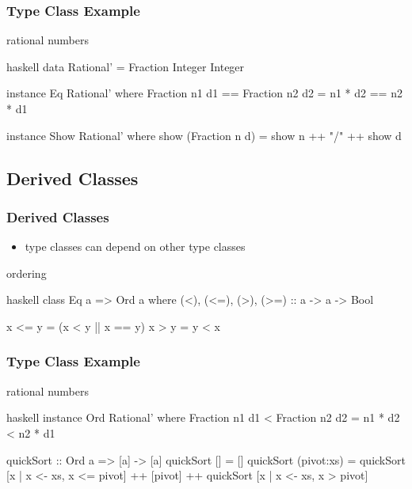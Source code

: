 \documentclass[dvipsnames]{beamer}
\theoremstyle{plain}
\begin{document}
\begin{frame}[fragile]
  \frametitle{Type Class Example}

  \begin{exampleblock}{rational numbers}
    \begin{pygments}{haskell}
data Rational' = Fraction Integer Integer

instance Eq Rational' where
  Fraction n1 d1 == Fraction n2 d2 =
      n1 * d2 == n2 * d1

instance Show Rational' where
  show (Fraction n d) = show n ++ "/" ++ show d
    \end{pygments}
  \end{exampleblock}
\end{frame}

\subsection{Derived Classes}

\begin{frame}[fragile]
  \frametitle{Derived Classes}

  \begin{itemize}
    \item type classes can depend on other type classes
  \end{itemize}

  \begin{exampleblock}{ordering}
    \begin{pygments}{haskell}
class Eq a => Ord a where
  (<), (<=), (>), (>=) :: a -> a -> Bool

  x <= y = (x < y || x == y)
  x >  y = y < x
    \end{pygments}
  \end{exampleblock}
\end{frame}

\begin{frame}[fragile]
  \frametitle{Type Class Example}

  \begin{exampleblock}{rational numbers}
    \begin{pygments}{haskell}
instance Ord Rational' where
  Fraction n1 d1 < Fraction n2 d2 = n1 * d2 < n2 * d1

quickSort :: Ord a => [a] -> [a]
quickSort []         = []
quickSort (pivot:xs) =
    quickSort [x | x <- xs, x <= pivot]
    ++ [pivot]
    ++ quickSort [x | x <- xs, x > pivot]
    \end{pygments}
  \end{exampleblock}
\end{frame}
\end{document}
